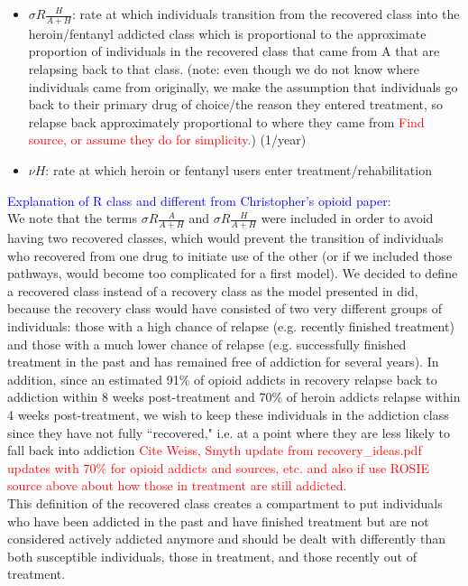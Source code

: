\documentclass[12pt]{article}
\begin{document}
\begin{itemize}
\item $\sigma R \frac{H}{A+H}$: rate at which individuals transition from the recovered class into the heroin/fentanyl addicted class which is proportional to the approximate proportion of individuals in the recovered class that came from A that are relapsing back to that class. (note: even though we do not know where individuals came from originally, we make the assumption that individuals go back to their primary drug of choice/the reason they entered treatment, so relapse back approximately proportional to where they came from \textcolor{red}{Find source, or assume they do for simplicity.}) (1/year)
\item $\nu H$: rate at which heroin or fentanyl users enter treatment/rehabilitation 
\end{itemize} 

\textcolor{blue}{Explanation of R class and different from Christopher's opioid paper:} \\
We note that the terms $\sigma R \frac{A}{A+H}$ and $\sigma R \frac{H}{A+H}$ were included in order to avoid having two recovered classes, which would prevent the transition of individuals who recovered from one drug to initiate use of the other (or if we included those pathways, would become too complicated for a first model). We decided to define a recovered class instead of a recovery class as the model presented in \cite{Battista} did, because the recovery class would have consisted of two very different groups of individuals: those with a high chance of relapse (e.g. recently finished treatment) and those with a much lower chance of relapse (e.g. successfully finished treatment in the past and has remained free of addiction for several years). In addition, since an estimated 91\% of opioid addicts in recovery relapse back to addiction within 8 weeks post-treatment and 70\% of heroin addicts relapse within 4 weeks post-treatment, we wish to keep these individuals in the addiction class since they have not fully ``recovered," i.e. at a point where they are less likely to fall back into addiction \textcolor{red}{Cite Weiss, Smyth} \textcolor{red}{update from recovery\_ideas.pdf updates with 70\% for opioid addicts and sources, etc. and also if use ROSIE source above about how those in treatment are still addicted.}\\ This definition of the recovered class creates a compartment to put individuals who have been addicted in the past and have finished treatment but are not considered actively addicted anymore and should be dealt with differently than both susceptible individuals, those in treatment, and those recently out of treatment.\\ 
\end{document}
